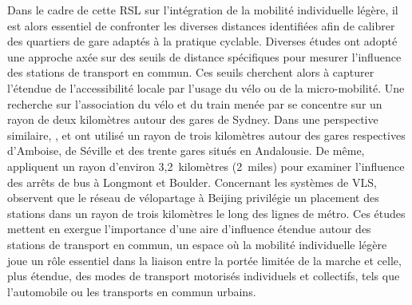 \begin{refsegment}
Dans le cadre de cette \acrshort{RSL} sur l'intégration de la mobilité individuelle légère, il est alors essentiel de confronter les diverses distances identifiées afin de calibrer des quartiers de gare adaptés à la pratique cyclable. Diverses études ont adopté une approche axée sur des seuils de distance spécifiques pour mesurer l'influence des stations de transport en commun. Ces seuils cherchent alors à capturer l'étendue de l'accessibilité locale par l'usage du vélo ou de la micro-mobilité. Une recherche sur l'association du vélo et du train menée par \textcolor{blue}{\textcite[6]{zhang_make_2023}} se concentre sur un rayon de deux kilomètres autour des gares de Sydney. Dans une perspective similaire, \textcolor{blue}{\textcite[15]{papon_rapport_2015}}, \textcolor{blue}{\textcite[30]{marques_potential_2017}} et \textcolor{blue}{\textcite[193]{garcia-bello_methodological_2019}} ont utilisé un rayon de trois kilomètres autour des gares respectives d'Amboise, de Séville et des trente gares situés en Andalousie. De même, \textcolor{blue}{\textcite[165]{krizek_bicycling_2010}} appliquent un rayon d'environ 3,2~kilomètres (2~miles) pour examiner l'influence des arrêts de bus à Longmont et Boulder. Concernant les systèmes de \acrshort{VLS}, \textcolor{blue}{\textcite[77]{liu_solving_2012}} observent que le réseau de vélopartage à Beijing privilégie un placement des stations dans un rayon de trois kilomètres le long des lignes de métro. Ces études mettent en exergue l'importance d'une aire d'influence étendue autour des stations de transport en commun, un espace où la mobilité individuelle légère joue un rôle essentiel dans la liaison entre la portée limitée de la marche et celle, plus étendue, des modes de transport motorisés individuels et collectifs, tels que l'automobile ou les transports en commun urbains.%


\end{refsegment}
